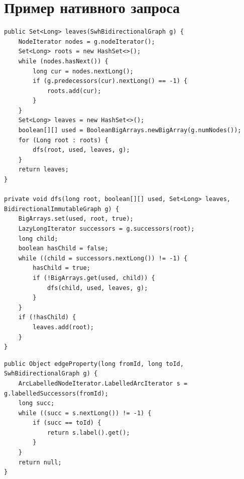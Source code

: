 \documentclass[times,specification,annotation]{itmo-student-thesis}
\begin{document}
\chapter{Пример нативного запроса}\label{sec:app:native}
\begin{lstlisting}[float=!h,caption={Получение листьев графа нативным способом},label={lst:native-dfs}]
public Set<Long> leaves(SwhBidirectionalGraph g) {
    NodeIterator nodes = g.nodeIterator();
    Set<Long> roots = new HashSet<>();
    while (nodes.hasNext()) {
        long cur = nodes.nextLong();
        if (g.predecessors(cur).nextLong() == -1) {
            roots.add(cur);
        }
    }
    Set<Long> leaves = new HashSet<>();
    boolean[][] used = BooleanBigArrays.newBigArray(g.numNodes());
    for (Long root : roots) {
        dfs(root, used, leaves, g);
    }
    return leaves;
}

private void dfs(long root, boolean[][] used, Set<Long> leaves, BidirectionalImmutableGraph g) {
    BigArrays.set(used, root, true);
    LazyLongIterator successors = g.successors(root);
    long child;
    boolean hasChild = false;
    while ((child = successors.nextLong()) != -1) {
        hasChild = true;
        if (!BigArrays.get(used, child)) {
            dfs(child, used, leaves, g);
        }
    }
    if (!hasChild) {
        leaves.add(root);
    }
}
\end{lstlisting}

\begin{lstlisting}[float=!h,caption={Получение свойства ребра нативным способом},label={lst:native-edgeprop}]
public Object edgeProperty(long fromId, long toId, SwhBidirectionalGraph g) {
    ArcLabelledNodeIterator.LabelledArcIterator s = g.labelledSuccessors(fromId);
    long succ;
    while ((succ = s.nextLong()) != -1) {
        if (succ == toId) {
            return s.label().get();
        }
    }
    return null;
}
\end{lstlisting}
\end{document}
